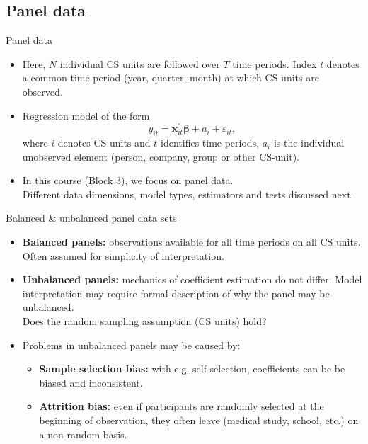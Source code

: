 \documentclass[usenames,dvipsnames]{beamer}
\begin{document}
\subsection*{Panel data}
\begin{frame}{Panel data}
\begin{itemize}
\item Here, $N$ individual CS units are followed over $T$ time periods. Index $t$ denotes a common time period (year, quarter, month) at which CS units are observed.
\medskip
\item Regression model of the form $$y_{it} = \bm{x}_{it}^{\prime}\bm{\beta} + a_i + \varepsilon_{it},$$ where $i$ denotes CS units and $t$ identifies time periods, $a_i$ is the individual unobserved element  (person, company, group or other CS-unit). 
\medskip
\item In this course (Block 3), we focus on panel data.\\ \medskip Different data dimensions, model types, estimators and tests discussed next.
\end{itemize}
\end{frame}
\begin{frame}{Balanced \& unbalanced panel data sets}
\begin{itemize}
\bigskip
\item \textbf{Balanced panels:} observations available for all time periods on all CS units. Often assumed for simplicity of interpretation.
\bigskip
\item \textbf{Unbalanced panels:} mechanics of coefficient estimation do not differ. Model interpretation may require formal description of why the panel may be unbalanced.\\Does the random sampling assumption (CS units) hold? 
\bigskip
\item Problems in unbalanced panels may be caused by: 
\medskip
\begin{itemize}
    \item \textbf{Sample selection bias:} with e.g. self-selection, coefficients can be be biased and inconsistent.
    \medskip
    \item \textbf{Attrition bias:} even if participants are randomly selected  at the beginning of observation, they often leave (medical study, school, etc.) on a non-random basis.   
\end{itemize}
\end{itemize}
\end{frame}
\end{document}
